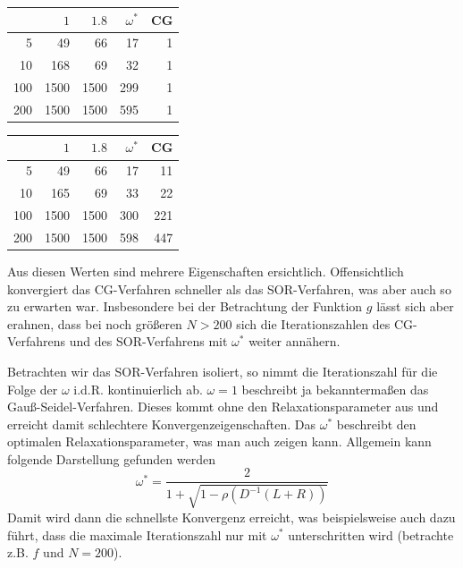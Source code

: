 \documentclass[ %
ngerman, %
a4paper, %
sectionreset, %
chapterstyle=framed, %
sectionstyle=dotted, %
titlefont=osfamily %
]{../../../../texmf/tex/latex/mathscriptMathTUD/mathscriptMathTUD}
\begin{document}
    \medskip
    
    \begin{minipage}{\dimexpr0.5\linewidth-\fboxrule-\fboxsep}
   	\centering
    \begin{tabular}{|r||rrr|r|}
    	\hline
    	\diagbox[dir=NW]{$N$}{$\omega$} & $1$ & $1.8$ & $\omega^\ast$ & CG \\
    	\hline \hline
    	  5 &   49 &   66 &  17 & 1 \\
    	 10 &  168 &   69 &  32 & 1 \\
    	100 & 1500 & 1500 & 299 & 1 \\
    	200 & 1500 & 1500 & 595 & 1 \\
    	\hline
    \end{tabular}
	\end{minipage}
    \begin{minipage}{\dimexpr0.5\linewidth-\fboxrule-\fboxsep}
    \centering
    \begin{tabular}{|r||rrr|r|}
    	\hline
    	\diagbox[dir=NW]{$N$}{$\omega$} & $1$ & $1.8$ & $\omega^\ast$ & CG \\
    	\hline \hline
    	  5 &   49 &   66 &  17 &  11 \\
    	 10 &  165 &   69 &  33 &  22 \\
    	100 & 1500 & 1500 & 300 & 221 \\
    	200 & 1500 & 1500 & 598 & 447 \\
    	\hline
    \end{tabular}
	\end{minipage}

	Aus diesen Werten sind mehrere Eigenschaften ersichtlich. Offensichtlich konvergiert das CG-Verfahren schneller als das SOR-Verfahren, was aber auch so zu erwarten war. Insbesondere bei der Betrachtung der Funktion $g$ lässt sich aber erahnen, dass bei noch größeren $N > 200$ sich die Iterationszahlen des CG-Verfahrens und des SOR-Verfahrens mit $\omega^\ast$ weiter annähern. 
	
	Betrachten wir das SOR-Verfahren isoliert, so nimmt die Iterationszahl für die Folge der $\omega$ i.d.R. kontinuierlich ab. $\omega=1$ beschreibt ja bekanntermaßen das Gauß-Seidel-Verfahren. Dieses kommt ohne den Relaxationsparameter aus und erreicht damit schlechtere Konvergenzeigenschaften. Das $\omega^\ast$ beschreibt den optimalen Relaxationsparameter, was man auch zeigen kann. Allgemein kann folgende Darstellung gefunden werden
	\begin{equation*}
		\omega^\ast = \frac{2}{1 + \sqrt{1 - \rho(D^{-1}(L+R))}}
	\end{equation*} 
	Damit wird dann die schnellste Konvergenz erreicht, was beispielsweise auch dazu führt, dass die maximale Iterationszahl nur mit $\omega^\ast$ unterschritten wird (betrachte z.B. $f$ und $N = 200$).
	
\end{document}
